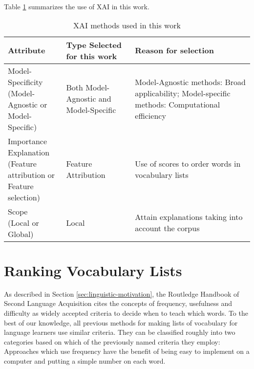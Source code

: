 Table \ref{table:XAi-method-criteria} summarizes the use of XAI in this work.

\begin{table}[ht]
	\centering
	\begin{tabularx}{\textwidth}{|X|X|X|}
		\hline
		\textbf{Attribute} & \textbf{Type Selected for this work} & \textbf{Reason for selection} \\
		\hline
		\makecell[l]{Model-Specificity                                                            \\(Model-Agnostic or \\Model-Specific)} & Both Model-Agnostic and Model-Specific & Model-Agnostic methods: Broad applicability; Model-specific methods: Computational efficiency \\
		\hline
		\makecell[l]{Importance Explanation                                                       \\(Feature attribution or \\Feature selection)}                                 & Feature Attribution                 & Use of scores to order words in vocabulary lists                                                                        \\
		\hline
		\makecell[l]{Scope                                                                        \\(Local or Global)}                                                       & Local                                  & Attain explanations taking into account the corpus                                          \\
		\hline
	\end{tabularx}
	\caption{XAI methods used in this work}
	\label{table:XAi-method-criteria}
\end{table}

\section{Ranking Vocabulary Lists} \label{sec:ranking-lists-of-vocabulary}

As described in Section \ref{sec:linguistic-motivation}, the Routledge Handbook of Second Language Acquisition cites the concepts of frequency, usefulness and difficulty as widely accepted criteria to decide when to teach which words.
To the best of our knowledge, all previous methods for making lists of vocabulary for language learners use similar criteria.
They can be classified roughly into two categories based on which of the previously named criteria they employ:
Approaches which use frequency have the benefit of being easy to implement on a computer and putting a simple number on each word.


